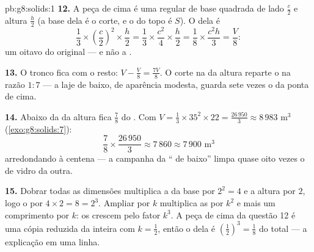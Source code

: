 \begin{solution}{pb:g8:solids:1}
\textbf{12.} A peça de cima é uma  regular de base quadrada de
lado $\frac c2$ e altura $\frac h2$ (a base dela é o corte, e o
 do topo é $S$). O  dela é
\[
\frac13 \times \left(\frac c2\right)^2 \times \frac h2
= \frac13 \times \frac{c^2}{4} \times \frac h2
= \frac{1}{8} \times \frac{c^2 h}{3}
= \frac{V}{8} :
\]
um oitavo do original --- e não a .

\textbf{13.} O tronco fica com o resto: $V - \frac V8 = \frac{7V}{8}$.
O corte na  da altura reparte o  na razão $1 : 7$ --- a
laje de baixo, de aparência modesta, guarda sete vezes o  da
ponta de cima.

\textbf{14.} Abaixo da  da altura fica $\frac78$ do . Com
$V = \frac13 \times 35^2 \times 22 = \frac{26\,950}{3} \approx
8\,983$ m$^3$ (\cref{exo:g8:solids:7}):
\[
\frac78 \times \frac{26\,950}{3} \approx 7\,860 \approx
7\,900 \text{ m}^3
\]
arredondando à centena --- a campanha da `` de baixo'' limpa
quase oito vezes o  de vidro da outra.

\textbf{15.} Dobrar todas as dimensões multiplica a  da base por
$2^2 = 4$ e a altura por $2$, logo o  por
$4 \times 2 = 8 = 2^3$. Ampliar por $k$ multiplica as  por $k^2$
e mais um comprimento por $k$: os  crescem pelo fator $k^3$. A
peça de cima da questão 12 é uma cópia reduzida da  inteira com
$k = \frac12$, então o  dela é
$\left(\frac12\right)^3 = \frac18$ do total --- a explicação em uma
linha.
\end{solution}
